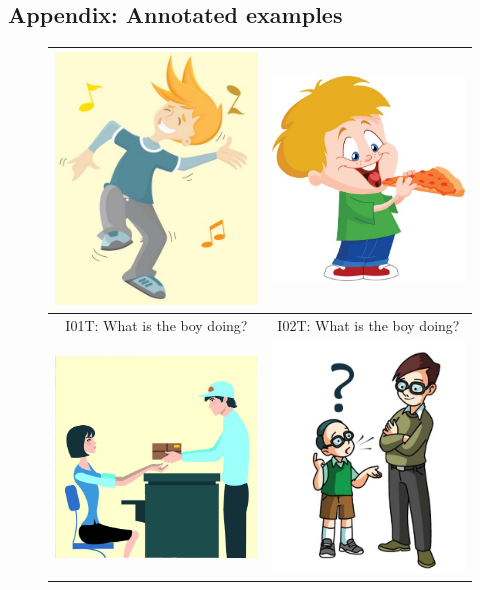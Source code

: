 \documentclass[12pt,notitlepage]{article}
\begin{document}
\clearpage

\subsection{Appendix: Annotated examples}

\begin{figure}[h]
\begin{center}
\begin{tabular}{|c|c|}
\hline
\includegraphics[width=0.35\columnwidth,trim=0 0 0 -3]{figures/I01.jpg} & \includegraphics[width=0.35\columnwidth,trim=0 0 0 -3]{figures/I02.jpg}\\
\hline
I01T: What is the boy doing? & I02T: What is the boy doing? \\
\hline
\hline
\includegraphics[width=0.35\columnwidth,trim=0 0 0 -3]{figures/I03.jpg} & \includegraphics[width=0.35\columnwidth,trim=0 0 0 -3]{figures/I11.jpg}\\

\end{tabular}
\end{center}
\end{figure}
\end{document}

